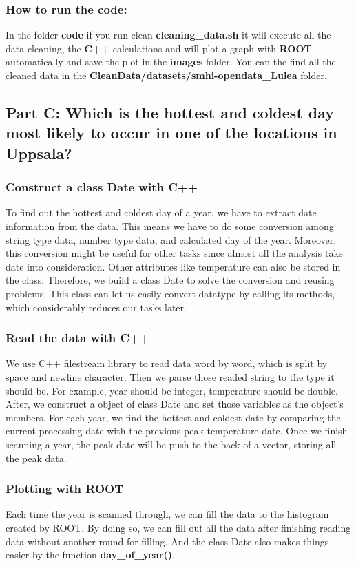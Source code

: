 \documentclass[a4paper]{article}
\begin{document}
\subsubsection{How to run the code:}
In the folder \textbf{code} if you run clean \textbf{cleaning\_data.sh} it will execute all the data cleaning, the \textbf{C++} calculations and will plot a graph with \textbf{ROOT} automatically and save the plot in the \textbf{images} folder. You can the find all the cleaned data in the \textbf{CleanData/datasets/smhi-opendata\_Lulea} folder.

\subsection{Part C: Which is the hottest and coldest day most likely to occur in one of the locations in Uppsala?}
\subsubsection{Construct a class Date with C++}
To find out the hottest and coldest day of a year, we have to extract date information from the data. This means we have to do some conversion among string type data, number type data, and calculated day of the year. Moreover, this conversion might be useful for other tasks since almost all the analysis take date into consideration. Other attributes like temperature can also be stored in the class. Therefore, we build a class Date to solve the conversion and reusing problems. This class can let us easily convert datatype by calling its methods, which considerably reduces our tasks later.
\subsubsection{Read the data with C++}
We use C++ filestream library to read data word by word, which is split by space and newline character. Then we parse those readed string to the type it should be. For example, year should be integer, temperature should be double. After, we construct a object of class Date and set those variables as the object's members. For each year, we find the hottest and coldest date by comparing the current processing date with the previous peak temperature date.
Once we finish scanning a year, the peak date will be push to the back of a vector, storing all the peak data.
\subsubsection{Plotting with ROOT}
Each time the year is scanned through, we can fill the data to the histogram created by ROOT. By doing so, we can fill out all the data after finishing reading data without another round for filling. And the class Date also makes things easier by the function \textbf{day\_of\_year()}. 
\end{document}
